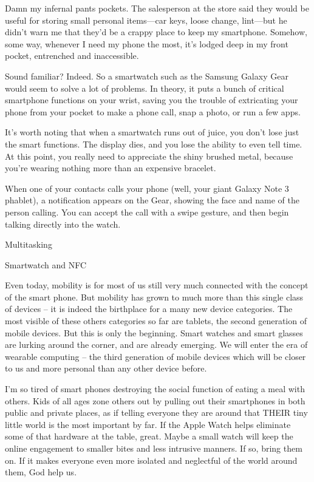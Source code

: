 \documentclass{article}
\begin{document}
Damn my infernal pants pockets. The salesperson at the store said they would be useful for storing small personal items—car keys, loose change, lint—but he didn’t warn me that they’d be a crappy place to keep my smartphone. Somehow, some way, whenever I need my phone the most, it’s lodged deep in my front pocket, entrenched and inaccessible.

Sound familiar? Indeed. So a smartwatch such as the Samsung Galaxy Gear would seem to solve a lot of problems. In theory, it puts a bunch of critical smartphone functions on your wrist, saving you the trouble of extricating your phone from your pocket to make a phone call, snap a photo, or run a few apps.

It’s worth noting that when a smartwatch runs out of juice, you don’t lose just the smart functions. The display dies, and you lose the ability to even tell time. At this point, you really need to appreciate the shiny brushed metal, because you’re wearing nothing more than an expensive bracelet.

When one of your contacts calls your phone (well, your giant Galaxy Note 3 phablet), a notification appears on the Gear, showing the face and name of the person calling. You can accept the call with a swipe gesture, and then begin talking directly into the watch.

Multitasking

Smartwatch and NFC 

 Even today, mobility is for most of us still very much connected with the concept of the smart phone. But mobility has grown to much more than this single class of devices – it is indeed the birthplace for a many new device categories. The most visible of these others categories so far are tablets, the second generation of mobile devices. But this is only the beginning. Smart watches and smart glasses are lurking around the corner, and are already emerging. We will enter the era of wearable computing – the third generation of mobile devices which will be closer to us and more personal than any other device before.

I'm so tired of smart phones destroying the social function of eating a meal with others. Kids of all ages zone others out by pulling out their smartphones in both public and private places, as if telling everyone they are around that THEIR tiny little world is the most important by far. If the Apple Watch helps eliminate some of that hardware at the table, great. Maybe a small watch will keep the online engagement to smaller bites and less intrusive manners. If so, bring them on. If it makes everyone even more isolated and neglectful of the world around them, God help us.
\end{document}
